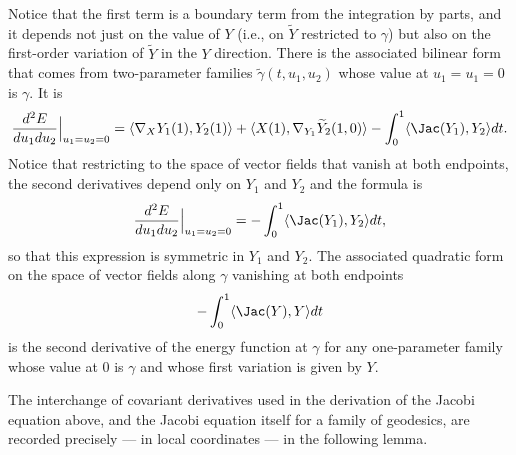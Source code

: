 Notice that the first term is a boundary term from the integration
by parts, and it depends not just on the value of $Y$ (i.e., on
$\widetilde Y$ restricted to $\gamma$) but also on the first-order
variation of $\widetilde Y$ in the $Y$ direction. There is the
associated bilinear form that comes from two-parameter families
$\tilde \gamma(t,u_1,u_2)$ whose value at $u_1=u_1=0$ is $\gamma$.
It is
$$\frac{d^2E}{du_1du_2}\Bigl|_{u_1=u_2=0}\Bigr.=\langle \nabla_XY_1(1),Y_2(1)\rangle+\langle
X(1),\nabla_{Y_1}\widetilde Y_2(1,0)\rangle-\int_0^1\langle \Jac(Y_1),Y_2\rangle dt.$$ Notice that restricting to the space of
vector fields that vanish at both endpoints, the second derivatives
depend only on $Y_1$ and $Y_2$ and the formula is
$$\frac{d^2E}{du_1du_2}\Bigl|_{u_1=u_2=0}\Bigr.=-\int_0^1\langle \Jac(Y_1),Y_2\rangle dt,$$
so that this expression is symmetric in $Y_1$ and $Y_2$. The
associated quadratic form on the space of vector fields along
$\gamma$ vanishing at both endpoints
$$-\int_0^1\langle \Jac(Y),Y\rangle dt$$
is the second derivative of the energy function at $\gamma$ for any
one-parameter family whose value at $0$ is $\gamma$ and whose first
variation is given by $Y$.

The interchange of covariant derivatives used in the derivation of
the Jacobi equation above, and the Jacobi equation itself for a
family of geodesics, are recorded precisely — in local coordinates —
in the following lemma.

